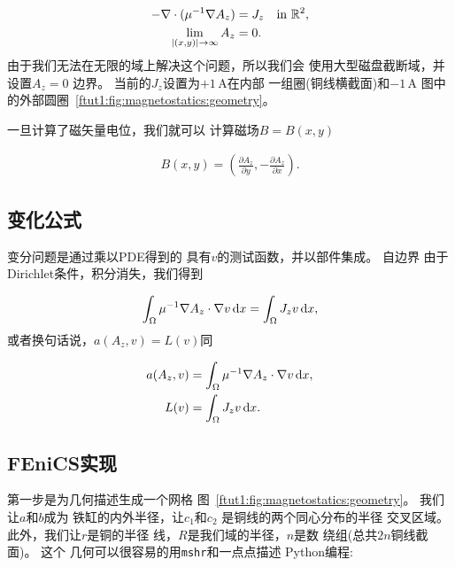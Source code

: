 \begin{align}
  - \nabla \cdot (\mu^{-1} \nabla A_z) &= J_z \quad \text{in } \mathbb{R}^2, \\
  \lim_{|(x, y)| \rightarrow \infty} A_z &= 0.
\end{align}
由于我们无法在无限的域上解决这个问题，所以我们会
使用大型磁盘截断域，并设置$A_z = 0$
边界。 当前的$J_z$设置为$+1\,\mathrm{A}$在内部
一组圈(铜线横截面)和$-1\,\mathrm{A}$
图中的外部圆圈~\ref{ftut1:fig:magnetostatics:geometry}。


一旦计算了磁矢量电位，我们就可以
计算磁场$B = B(x,y)$

\begin{align}
  B(x, y) =
  \left(\frac{\partial A_z}{\partial y},
       -\frac{\partial A_z}{\partial x}\right).
\end{align}

\subsection{变化公式}

变分问题是通过乘以PDE得到的
具有$v$的测试函数，并以部件集成。 自边界
由于Dirichlet条件，积分消失，我们得到

\begin{equation}
  \int_{\Omega} \mu^{-1} \nabla A_z \cdot \nabla v \, \mathrm{d}x
  = \int_{\Omega} J_z v \, \mathrm{d}x,
\end{equation}
或者换句话说，$a(A_z,v) = L(v)$同

\begin{align}
  a(A_z, v) &= \int_{\Omega} \mu^{-1} \nabla A_z \cdot \nabla v \, \mathrm{d}x, \\
  L(v) &= \int_{\Omega} J_z v \, \mathrm{d}x.
\end{align}

\subsection{FEniCS实现}

第一步是为几何描述生成一个网格
图~\ref{ftut1:fig:magnetostatics:geometry}。 我们让$a$和$b$成为
铁缸的内外半径，让$c_1$和$c_2$
是铜线的两个同心分布的半径
交叉区域。 此外，我们让$r$是铜的半径
线，$R$是我们域的半径，$n$是数
绕组(总共$2n$铜线截面)。 这个
几何可以很容易的用\texttt{mshr}和一点点描述
Python编程:


